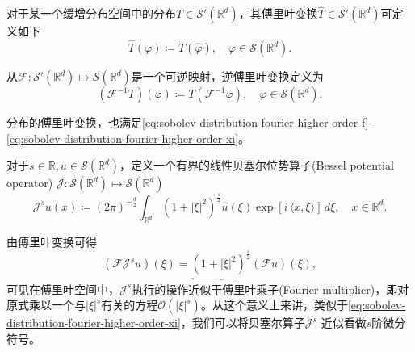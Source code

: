 \begin{definition}[分布的傅里叶变换]
  \label{definition:distribution-fourier-transform}
  对于某一个缓增分布空间中的分布$T \in \mathcal{S}'(\mathbb{R}^d)$，其傅里叶变换$\widehat{T} \in \mathcal{S}'(\mathbb{R}^d)$可定义如下
  \begin{equation*}
    \widehat{T}(\varphi) \coloneqq T(\widehat{\varphi}), \quad \varphi \in \mathcal{S}(\mathbb{R}^d).
  \end{equation*}

  从$\mathcal{F}:\mathcal{S}'(\mathbb{R}^d) \mapsto \mathcal{S}(\mathbb{R}^d)$是一个可逆映射，逆傅里叶变换定义为
  \begin{equation*}
    \left( \mathcal{F}^{-1} T \right) (\varphi) \coloneqq T \left(\mathcal{F}^{-1} \varphi \right), \quad \varphi \in \mathcal{S}(\mathbb{R}^d).
  \end{equation*}

  分布的傅里叶变换，也满足\eqref{eq:sobolev-distribution-fourier-higher-order-f}-\eqref{eq:sobolev-distribution-fourier-higher-order-xi}。
\end{definition}

\begin{definition}[贝塞尔位势空间]
  \label{definition:bessel-potential-space}
对于$s \in \mathbb{R}, u \in \mathcal{S}(\mathbb{R}^d)$，定义一个有界的线性贝塞尔位势算子(Bessel potential operator) $\mathcal{J}: \mathcal{S}(\mathbb{R}^d) \mapsto \mathcal{S}(\mathbb{R}^d)$
\begin{equation}
  \label{eq:bessel-potential-operator-def}
  \mathcal{J}^s u(x) \coloneqq \left( 2 \pi \right)^{- \frac{d}{2}}
  \int_{\mathbb{R}^d}
  \left( 1 + \left| \xi \right|^2 \right)^{\frac{s}{2}}
  \widehat{u}(\xi)
  \exp \left[ i \, \langle x, \xi \rangle \right] \, d \xi, \quad x \in \mathbb{R}^d.
\end{equation}
\end{definition}
由傅里叶变换可得
\begin{equation*}
  \left( \mathcal{F} \mathcal{J}^s u \right)(\xi) = \underbrace{\left(
  1 + \left| \xi \right|^2
  \right)^{\frac{s}{2}}}
  \left( \mathcal{F} u \right)(\xi),
\end{equation*}
可见在傅里叶空间中，$\mathcal{J}^s$执行的操作近似于傅里叶乘子(Fourier multiplier)，即对原式乘以一个与$\left| \xi \right|^s$有关的方程$\mathcal{O} \left( \left| \xi \right|^s \right)$。从这个意义上来讲，类似于\eqref{eq:sobolev-distribution-fourier-higher-order-xi}，我们可以将贝塞尔算子$\mathcal{J}^s$ 近似看做$s$阶微分符号。

